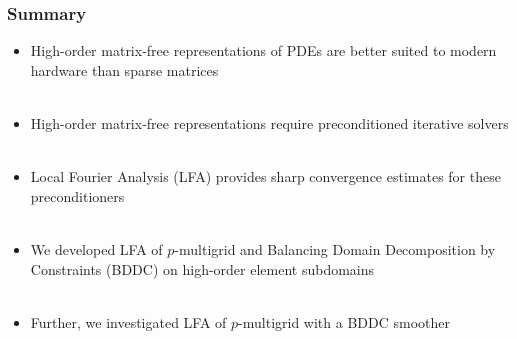 \documentclass{beamer}
\begin{document}
\begin{frame}
\begin{center}
\frametitle{Summary}

\begin{itemize}

\item High-order matrix-free representations of PDEs are better suited to modern hardware than sparse matrices\\

~\\

\item High-order matrix-free representations require preconditioned iterative solvers\\

~\\

\item Local Fourier Analysis (LFA) provides sharp convergence estimates for these preconditioners\\

~\\

\item We developed LFA of $p$-multigrid and Balancing Domain Decomposition by Constraints (BDDC) on high-order element subdomains\\

~\\

\item Further, we investigated LFA of $p$-multigrid with a BDDC smoother

\end{itemize}

\end{center}
\end{frame}


\begin{frame}[noframenumbering]
\titlepage %
\end{frame}

\begin{frame}
\end{frame}

\begin{frame}[noframenumbering]
\titlepage %
\end{frame}


\end{document}
